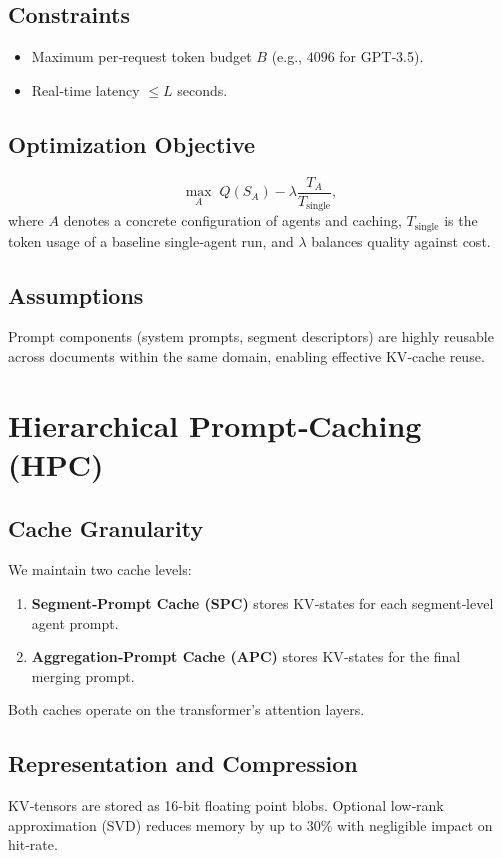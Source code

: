 \documentclass[conference]{IEEEtran}
\begin{document}
\subsection{Constraints}
\begin{itemize}
\item Maximum per‑request token budget $B$ (e.g., $4096$ for GPT‑3.5).
\item Real‑time latency $\le L$ seconds.
\end{itemize}

\subsection{Optimization Objective}
\begin{equation}
\label{eq:objective}
\max_{A}\; Q(S_A) - \lambda \frac{T_A}{T_{\text{single}}},
\end{equation}
where $A$ denotes a concrete configuration of agents and caching, $T_{\text{single}}$ is the token usage of a baseline single‑agent run, and $\lambda$ balances quality against cost.

\subsection{Assumptions}
Prompt components (system prompts, segment descriptors) are highly reusable across documents within the same domain, enabling effective KV‑cache reuse.

\section{Hierarchical Prompt‑Caching (HPC)}
\subsection{Cache Granularity}
We maintain two cache levels:
\begin{enumerate}
\item \textbf{Segment‑Prompt Cache (SPC)} stores KV‑states for each segment‑level agent prompt.
\item \textbf{Aggregation‑Prompt Cache (APC)} stores KV‑states for the final merging prompt.
\end{enumerate}
Both caches operate on the transformer’s attention layers.

\subsection{Representation and Compression}
KV‑tensors are stored as 16‑bit floating point blobs.  Optional low‑rank approximation (SVD) reduces memory by up to $30\%$ with negligible impact on hit‑rate.
\end{document}
